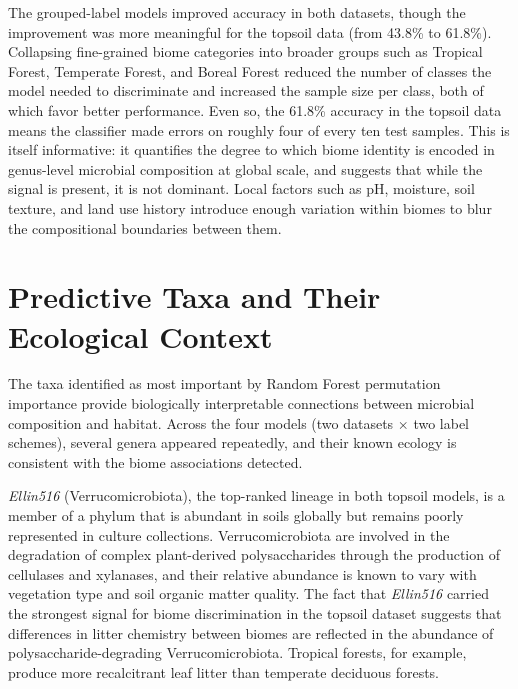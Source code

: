 \documentclass[12pt, oneside]{report}
\begin{document}
The grouped-label models improved accuracy in both datasets, though the improvement was
more meaningful for the topsoil data (from 43.8\% to 61.8\%). Collapsing fine-grained
biome categories into broader groups such as Tropical Forest, Temperate Forest, and Boreal
Forest reduced the number of classes the model needed to discriminate and increased the
sample size per class, both of which favor better performance. Even so, the 61.8\% accuracy
in the topsoil data means the classifier made errors on roughly four of every ten test
samples. This is itself informative: it quantifies the degree to which biome identity is
encoded in genus-level microbial composition at global scale, and suggests that while the
signal is present, it is not dominant. Local factors such as pH, moisture, soil texture, 
and land use history introduce enough variation within biomes to blur the compositional
boundaries between them.

\section{Predictive Taxa and Their Ecological Context}
\label{disc:taxa}

The taxa identified as most important by Random Forest permutation importance provide
biologically interpretable connections between microbial composition and habitat. Across the four
models (two datasets $\times$ two label schemes), several genera
appeared repeatedly, and their known ecology is consistent with the biome associations
detected.

\textit{Ellin516} (Verrucomicrobiota), the top-ranked lineage in both topsoil models, is a
member of a phylum that is abundant in soils globally but remains poorly represented in
culture collections\cite{bergmann2011}. Verrucomicrobiota are
involved in the degradation of complex plant-derived polysaccharides through the production
of cellulases and xylanases, and their relative abundance is known to vary with vegetation
type and soil organic matter quality\cite{navarrete2015}. The fact that
\textit{Ellin516} carried the strongest signal for biome discrimination in the topsoil
dataset suggests that differences in litter chemistry between biomes are reflected in the
abundance of polysaccharide-degrading Verrucomicrobiota. Tropical forests, for example,
produce more recalcitrant leaf litter than temperate deciduous forests.
\end{document}
